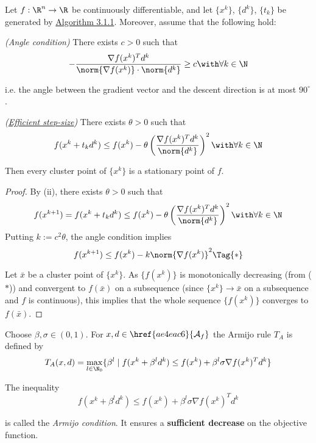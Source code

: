 Let $f:\R^n\to\R$ be continuously differentiable, and let $\{x^k\}$,
$\{d^k\}$, $\{t_k\}$ be generated by \href{edbf62c}{Algorithm 3.1.1}.
Moreover, assume that the following hold:
\begin{enumerati}
	\item \textit{(Angle condition)} There exists $c>0$ such that
	$$
		-\frac{\nabla f(x^k)^Td^k}{\norm{\nabla f(x^k)}\cdot\norm{d^k}}\geq c\with\forall k\in\N
	$$

	i.e. the angle between the gradient vector and the descent direction
	is at most $90^\circ$.
	\item \textit{(\href{d23fdf0}{Efficient step-size})} There exists
	$\theta>0$ such that
	$$
		f(x^k+t_kd^k)\leq f(x^k)-\theta\left(
		\frac{\nabla f(x^k)^Td^k}{\norm{d^k}}
		\right)^2\with\forall k\in\N
	$$
\end{enumerati}
Then every cluster point of $\{x^k\}$ is a stationary point of $f$.

\begin{proof}
	By (ii), there exists $\theta>0$ such that
	$$
		f(x^{k+1})=f(x^k+t_kd^k)\leq
		f(x^k)-\theta\left(
		\frac{\nabla f(x^k)^Td^k}{\norm{d^k}}
		\right)^2\with\forall k\in\N
	$$
	Putting $k:=c^2\theta$, the angle condition implies
	\begin{equation*}
    f(x^{k+1})\leq f(x^k)-k\norm{\nabla f(x^k)}^2\Tag{*}
	\end{equation*}

  Let $\bar x$ be a cluster point of $\{x^k\}$. As $\{f(x^k)\}$ is
  monotonically decreasing (from ($*$)) and convergent to $f(\bar x)$
  on a subsequence (since $\{x^k\}\to\bar x$ on a subsequence and $f$
  is continuous), this implies that the whole sequence $\{f(x^k)\}$
  converges to $f(\bar x)$. 
\end{proof}

\label{fefb024}

Choose $\beta,\sigma\in(0,1)$. For $x,d\in\href{ae4eac6}{\mathcal
		A_f}$ the Armijo rule $T_A$ is defined by
$$
	T_A(x,d)=\max_{l\in\N_0}\{\beta^l\mid f(x^k+\beta^ld^k)\leq
	f(x^k)+\beta^l\sigma\nabla f(x^k)^Td^k\}
$$

The inequality
$$
	f(x^k+\beta^ld^k)\leq f(x^k)+\beta^l\sigma\nabla f(x^k)^Td^k
$$

is called the \textit{Armijo condition}. It ensures a
\textbf{sufficient decrease} on the objective function.

\label{ae7f42d}

